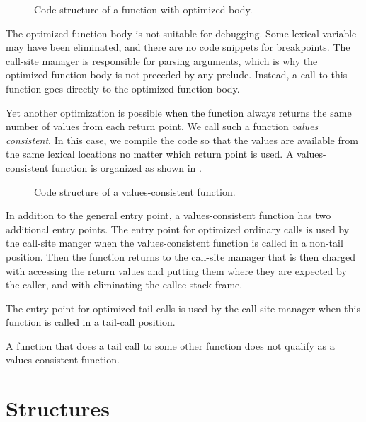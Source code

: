 \begin{figure}
\begin{center}
\end{center}
\caption{\label{fig-function-code-structure-2}
Code structure of a function with optimized body.}
\end{figure}

The optimized function body is not suitable for debugging.  Some
lexical variable may have been eliminated, and there are no code
snippets for breakpoints.  The call-site manager is responsible for
parsing arguments, which is why the optimized function body is not
preceded by any prelude.  Instead, a call to this function goes
directly to the optimized function body.

Yet another optimization is possible when the function always returns
the same number of values from each return point.  We call such a
function \emph{values consistent}.  In this case, we compile the code
so that the values are available from the same lexical locations no
matter which return point is used.  A values-consistent function is
organized as shown in
. 

\begin{figure}
\begin{center}
\end{center}
\caption{\label{fig-function-code-structure-values-consistent}
Code structure of a values-consistent function.}
\end{figure}

In addition to the general entry point, a values-consistent function
has two additional entry points.  The entry point for optimized
ordinary calls is used by the call-site manger when the
values-consistent function is called in a non-tail position.  Then the
function returns to the call-site manager that is then charged with
accessing the return values and putting them where they are expected
by the caller, and with eliminating the callee stack frame.

The entry point for optimized tail calls is used by the call-site
manager when this function is called in a tail-call position. 

A function that does a tail call to some other function does not
qualify as a values-consistent function.

\section{Structures}

